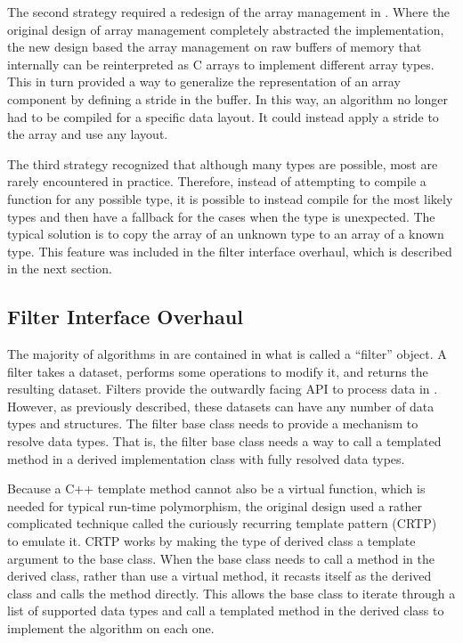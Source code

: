 The second strategy required a redesign of the array management in \vtkm.
Where the original design of array management completely abstracted the implementation, the new design based the array management on raw buffers of memory that internally can be reinterpreted as C arrays to implement different array types.
This in turn provided a way to generalize the representation of an array component by defining a stride in the buffer.
In this way, an algorithm no longer had to be compiled for a specific data layout.
It could instead apply a stride to the array and use any layout.

The third strategy recognized that although many types are possible, most are rarely encountered in practice.
Therefore, instead of attempting to compile a function for any possible type, it is possible to instead compile for the most likely types and then have a fallback for the cases when the type is unexpected.
The typical solution is to copy the array of an unknown type to an array of a known type.
This feature was included in the filter interface overhaul, which is described in the next section.

\subsection{Filter Interface Overhaul}
\label{sec:filter-overhaul}


The majority of algorithms in \vtkm are contained in what is called a ``filter'' object.
A filter takes a dataset, performs some operations to modify it, and returns the resulting dataset.
Filters provide the outwardly facing API to process data in \vtkm.
However, as previously described, these datasets can have any number of data types and structures.
The \vtkm filter base class needs to provide a mechanism to resolve data types.
That is, the filter base class needs a way to call a templated method in a derived implementation class with fully resolved data types.

Because a C++ template method cannot also be a virtual function, which is needed for typical run-time polymorphism, the original design used a rather complicated technique called the curiously recurring template pattern (CRTP)~\citep{Coplien1995} to emulate it.
CRTP works by making the type of derived class a template argument to the base class.
When the base class needs to call a method in the derived class, rather than use a virtual method, it recasts itself as the derived class and calls the method directly.
This allows the base class to iterate through a list of supported data types and call a templated method in the derived class to implement the algorithm on each one.

